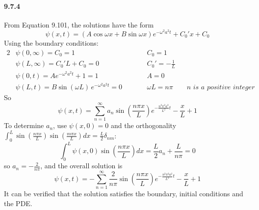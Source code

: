 \documentclass[a4paper]{article}
\begin{document}
\paragraph{9.7.4}
From Equation 9.101, the solutions have the form
\[
\psi(x,t)=(A\cos\omega x+B\sin\omega x)e^{-\omega^2a^2t}+C_0'x+C_0
\]
Using the boundary conditions: 
\begin{alignat*}{2}
    & \psi(0,\infty)=C_0=1\qquad && C_0=1\\
    & \psi(L,\infty)=C_0'L+C_0=0\qquad && C_0'=-\frac{1}{L}\\
    & \psi(0,t)=Ae^{-\omega^2 a^2t}+1=1\qquad && A=0\\\
    & \psi(L,t)=B\sin(\omega L)\,e^{-\omega^2a^2t}=0\qquad && \omega L=n\pi\qquad\textit{n is a positive integer}
\end{alignat*}
So
\[
\psi(x,t)=\sum_{n=1}^\infty a_n\sin\left(\frac{n\pi x}{L}\right)e^{-\frac{n^2\pi^2a^2}{L^2}t}-\frac{x}{L}+1
\]
To determine $a_n$, use $\psi(x,0)=0$ and the orthogonality $\int_0^L\sin\left(\frac{n\pi x}{L}\right)\sin\left(\frac{m\pi x}{L}\right)dx=\frac{L}{2}\delta_{nm}$:
\[
\int_0^L\psi(x,0)\sin\left(\frac{n\pi x}{L}\right)dx=\frac{L}{2}a_n+\frac{L}{n\pi}=0
\]
so $a_n=-\frac{2}{n\pi}$, and the overall solution is
\[
\psi(x,t)=-\sum_{n=1}^\infty \frac{2}{n\pi}\sin\left(\frac{n\pi x}{L}\right)e^{-\frac{n^2\pi^2a^2}{L^2}t}-\frac{x}{L}+1
\]
It can be verified that the solution satisfies the boundary, initial conditions and the PDE.
\end{document}
